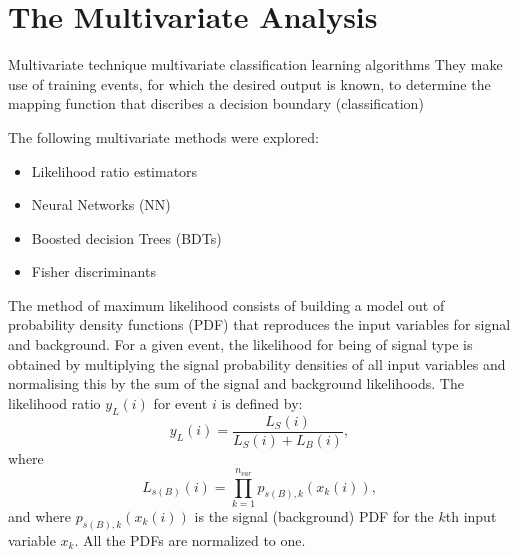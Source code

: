 %
\chapter{The Multivariate Analysis}\label{ch:mva}
%

Multivariate technique
multivariate classification
learning algorithms
They make use of training events, for which the desired output is known, to determine the mapping function that discribes a decision boundary (classification)



The following multivariate methods were explored:

\begin{itemize}\addtolength{\itemsep}{-0.4\baselineskip}
\item
Likelihood ratio estimators 
\item
Neural Networks (NN)
\item
Boosted decision Trees (BDTs)
\item
Fisher discriminants
\end{itemize}

The method of maximum likelihood consists of building a model out of probability density functions (PDF) that reproduces the input variables for signal and background. For a given event, the likelihood for being of signal type is obtained by multiplying the signal probability densities of all input variables %
and normalising this by the sum of the signal and background likelihoods. %
The likelihood ratio $y_{L}(i)$ for event $i$ is defined by:
%
\begin{equation}
y_{L}(i) = \frac{L_S(i)}{L_S(i)+L_B(i)},
\end{equation}
%
where
%
\begin{equation}
L_{s(B)}(i) = \prod^{n_{var}}_{k=1}  p_{s(B),k}(x_k(i)),
\end{equation}
%
and where $p_{s(B),k}(x_k(i))$ is the signal (background) PDF for the $k$th input variable $x_k$. All the PDFs are normalized to one. 

